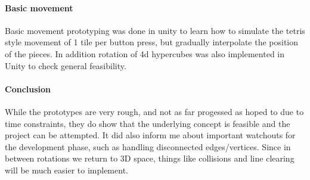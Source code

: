 \documentclass{article}
\begin{document}
\paragraph{Basic movement}
Basic movement prototyping was done in unity to learn how to simulate the tetris style movement of 1 tile per button press, but gradually interpolate the position of the pieces.
In addition rotation of 4d hypercubes was also implemented in Unity to check general feasibility.
\paragraph{Conclusion}
While the prototypes are very rough, and not as far progessed as hoped to due to time constraints, they do show that the underlying concept is feasible and the project can be attempted. It did also inform me about important watchouts for the development phase, such as handling disconnected edges/vertices. Since in between rotations we return to 3D space, things like collisions and line clearing will be much easier to implement.




\end{document}
